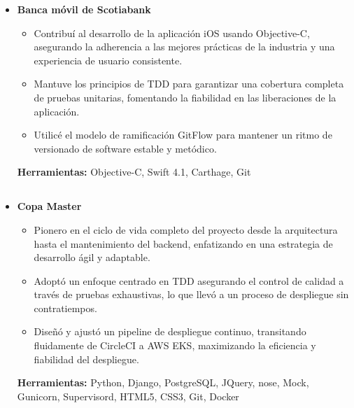 \documentclass[11pt,a4paper,english]{moderncv}
\begin{document}
{\begin{itemize}
\begin{itemize}
            \item Innové un robusto pipeline de despliegue continuo utilizando CircleCI y AWS EKS para agilizar la entrega de software.
            \item Mejoré el rendimiento descargando tareas computacionalmente intensivas a trabajos de Celery, optimizando operaciones asíncronas.
            \item Desarrollé un sistema automatizado de moderación de contenido utilizando AWS Rekognition y Azure Cognitive Services que mantuvo la calidad y el cumplimiento del contenido.
        \end{itemize}
        \textbf{Herramientas:} Python, asyncio, Flask, SQLAlchemy, MySQL, MongoDB, Mock, Git, Docker
    \item \textbf{Banca móvil de Scotiabank}
        \begin{itemize}
            \item Contribuí al desarrollo de la aplicación iOS usando Objective-C, asegurando la adherencia a las mejores prácticas de la industria y una experiencia de usuario consistente.
            \item Mantuve los principios de TDD para garantizar una cobertura completa de pruebas unitarias, fomentando la fiabilidad en las liberaciones de la aplicación.
            \item Utilicé el modelo de ramificación GitFlow para mantener un ritmo de versionado de software estable y metódico.
        \end{itemize}
        \textbf{Herramientas:} Objective-C, Swift 4.1, Carthage, Git
\end{itemize}
}

\subsection{}

{
    \begin{itemize}
        \item \textbf{Copa Master}
            \begin{itemize}
                \item Pionero en el ciclo de vida completo del proyecto desde la arquitectura hasta el mantenimiento del backend, enfatizando en una estrategia de desarrollo ágil y adaptable.
                \item Adoptó un enfoque centrado en TDD asegurando el control de calidad a través de pruebas exhaustivas, lo que llevó a un proceso de despliegue sin contratiempos.
                \item Diseñó y ajustó un pipeline de despliegue continuo, transitando fluidamente de CircleCI a AWS EKS, maximizando la eficiencia y fiabilidad del despliegue.
            \end{itemize}
            \textbf{Herramientas:} Python, Django, PostgreSQL, JQuery, nose, Mock, Gunicorn, Supervisord, HTML5, CSS3, Git, Docker
    \end{itemize}
}
\end{document}
